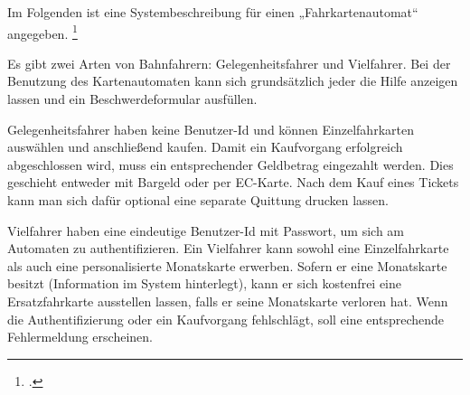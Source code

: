 \documentclass{lehramt-informatik-aufgabe}
\begin{document}

Im Folgenden ist eine Systembeschreibung für einen „Fahrkartenautomat“
angegeben.
\footcite{examen:66116:2020:09}

Es gibt zwei Arten von Bahnfahrern: Gelegenheitsfahrer und Vielfahrer.
Bei der Benutzung des Kartenautomaten kann sich grundsätzlich jeder die
Hilfe anzeigen lassen und ein Beschwerdeformular ausfüllen.

Gelegenheitsfahrer haben keine Benutzer-Id und können Einzelfahrkarten
auswählen und anschließend kaufen. Damit ein Kaufvorgang erfolgreich
abgeschlossen wird, muss ein entsprechender Geldbetrag eingezahlt
werden. Dies geschieht entweder mit Bargeld oder per EC-Karte. Nach dem
Kauf eines Tickets kann man sich dafür optional eine separate Quittung
drucken lassen.

Vielfahrer haben eine eindeutige Benutzer-Id mit Passwort, um sich am
Automaten zu authentifizieren. Ein Vielfahrer kann sowohl eine
Einzelfahrkarte als auch eine personalisierte Monatskarte erwerben.
Sofern er eine Monatskarte besitzt (Information im System hinterlegt),
kann er sich kostenfrei eine Ersatzfahrkarte ausstellen lassen, falls er
seine Monatskarte verloren hat. Wenn die Authentifizierung oder ein
Kaufvorgang fehlschlägt, soll eine entsprechende Fehlermeldung
erscheinen.
\end{document}
